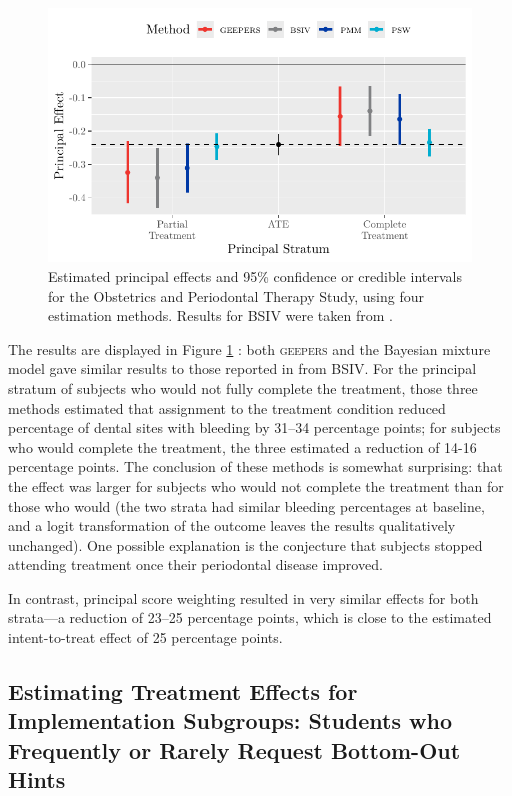 \documentclass[]{article}
\begin{document}
\begin{figure}
  \centering
  \includegraphics{figure/opts.pdf}
  \caption{Estimated principal effects and 95\% confidence or credible intervals for the Obstetrics and Periodontal Therapy Study, using four estimation methods. Results for BSIV were taken from \citet{richardson2023estimating}.}
  \label{fig:opt}
\end{figure}


The results are displayed in Figure \ref{fig:opt}%
: both \textsc{geepers} and the Bayesian mixture model gave similar results to those reported in \citet{richardson2023estimating} from BSIV.
For the principal stratum of subjects who would not fully complete the treatment, those three methods estimated that assignment to the treatment condition reduced percentage of dental sites with bleeding by 31--34 percentage points; for subjects who would complete the treatment, the three estimated a reduction of 14-16 percentage points.
The conclusion of these methods is somewhat surprising: that the effect was larger for subjects who would not complete the treatment than for those who would (the two strata had similar bleeding percentages at baseline, and a logit transformation of the outcome leaves the results qualitatively unchanged). 
One possible explanation is the conjecture that subjects stopped attending treatment once their periodontal disease improved.

In contrast, principal score weighting resulted in very similar effects for both strata---a reduction of 23--25 percentage points, which is close to the estimated intent-to-treat effect of 25 percentage points.

\subsection{Estimating Treatment Effects for Implementation Subgroups: Students who Frequently or Rarely Request Bottom-Out Hints}\label{sec:fh2t}
\end{document}
